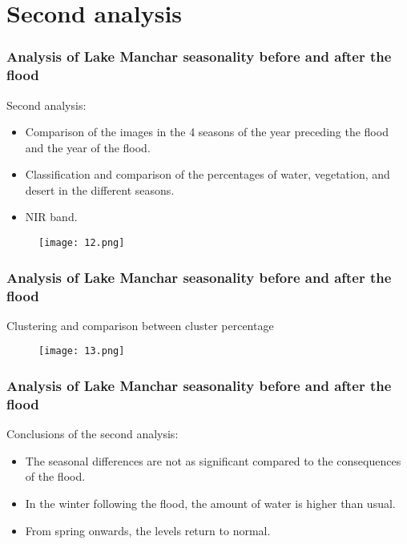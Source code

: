 \documentclass{beamer}
\begin{document}
\section{Second analysis}

\begin{frame}
  \frametitle{\small Analysis of Lake Manchar seasonality before and after the flood} 

  \small Second analysis:
  \begin{itemize}
      \item \small Comparison of the images in the 4 seasons of the year preceding the flood and the year of the flood.
      \item \small Classification and comparison of the percentages of water, vegetation, and desert in the different seasons.
      \item \small NIR band.
  \end{itemize}
  \begin{figure}
      \centering
      \texttt{[image: 12.png]}
      \label{fig:enter-label}
  \end{figure}
  
\end{frame}

\begin{frame}
  \frametitle{\small Analysis of Lake Manchar seasonality before and after the flood} 

  \centering\small Clustering and comparison between cluster percentage

\begin{figure}
    \centering
    \texttt{[image: 13.png]}
    \label{fig:enter-label}
\end{figure}
  
\end{frame}
  
\begin{frame}
      \frametitle{\small Analysis of Lake Manchar seasonality before and after the flood} 

    \small Conclusions of the second analysis:
    \begin{itemize}
        \item \small The seasonal differences are not as significant compared to the consequences of the flood. 
        \item \small In the winter following the flood, the amount of water is higher than usual. 
        \item \small From spring onwards, the levels return to normal.
    \end{itemize}
\end{frame}
\end{document}
